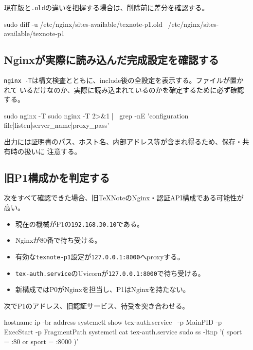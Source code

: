 \documentclass[uplatex,a4paper,11pt]{jsarticle}
\begin{document}
現在版と\texttt{.old}の違いを把握する場合は、削除前に差分を確認する。

\begin{command}
sudo diff -u /etc/nginx/sites-available/texnote-p1.old \
  /etc/nginx/sites-available/texnote-p1
\end{command}

\subsection{Nginxが実際に読み込んだ完成設定を確認する}

\texttt{nginx -T}は構文検査とともに、include後の全設定を表示する。ファイルが置かれて
いるだけなのか、実際に読み込まれているのかを確定するために必ず確認する。

\begin{command}
sudo nginx -T
sudo nginx -T 2>&1 | \
  grep -nE 'configuration file|listen|server_name|proxy_pass'
\end{command}

出力には証明書のパス、ホスト名、内部アドレス等が含まれ得るため、保存・共有時の扱いに
注意する。

\subsection{旧P1構成かを判定する}

次をすべて確認できた場合、旧TeXNoteのNginx・認証API構成である可能性が高い。

\begin{itemize}
  \item 現在の機械がP1の\texttt{192.168.30.10}である。
  \item Nginxが80番で待ち受ける。
  \item 有効な\texttt{texnote-p1}設定が\texttt{127.0.0.1:8000}へproxyする。
  \item \texttt{tex-auth.service}のUvicornが\texttt{127.0.0.1:8000}で待ち受ける。
  \item 新構成ではP0がNginxを担当し、P1はNginxを持たない。
\end{itemize}

次でP1のアドレス、旧認証サービス、待受を突き合わせる。

\begin{command}
hostname
ip -br address
systemctl show tex-auth.service \
  -p MainPID -p ExecStart -p FragmentPath
systemctl cat tex-auth.service
sudo ss -ltnp '( sport = :80 or sport = :8000 )'
\end{command}
\end{document}
